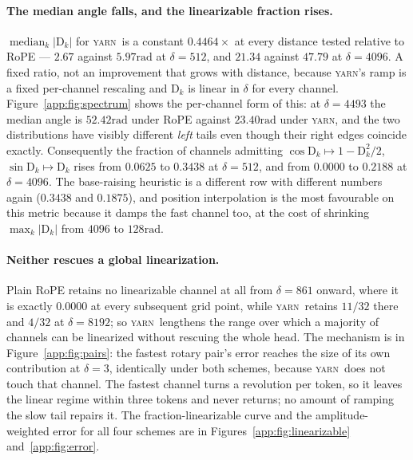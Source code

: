 \documentclass{article}
\theoremstyle{plain}
\theoremstyle{remark}
\newcommand{\yarn}{\textsc{yarn}}
\newcommand{\D}{\mathrm{D}_k}
\newcommand{\rad}{\mathrm{rad}}
\begin{document}
\paragraph{The median angle falls, and the linearizable fraction rises.}
$\operatorname{median}_k|\D|$ for \yarn\ is a constant $0.4464\times$ at every
distance tested relative to RoPE --- $2.67$ against $5.97\rad$ at $\delta = 512$,
and $21.34$ against $47.79$ at $\delta = 4096$. A fixed ratio, not an
improvement that grows with distance, because \yarn's ramp is a fixed
per-channel rescaling and $\D$ is linear in $\delta$ for every channel.
Figure~\ref{app:fig:spectrum} shows the per-channel form of this: at
$\delta = 4493$ the median angle is $52.42\rad$ under RoPE against
$23.40\rad$ under \yarn, and the two distributions have visibly different
\emph{left} tails even though their right edges coincide exactly.
Consequently the fraction of channels admitting $\cos \D \mapsto 1 - \D^2/2$,
$\sin \D \mapsto \D$ rises from $0.0625$ to $0.3438$ at $\delta = 512$, and from
$0.0000$ to $0.2188$ at $\delta = 4096$. The base-raising heuristic is a
different row with different numbers again ($0.3438$ and $0.1875$), and
position interpolation is the most favourable on this metric because it damps
the fast channel too, at the cost of shrinking $\max_k|\D|$ from $4096$ to
$128\rad$.

\paragraph{Neither rescues a global linearization.}
Plain RoPE retains no linearizable channel at all from $\delta = 861$ onward,
where it is exactly $0.0000$ at every subsequent grid point, while \yarn\ retains
$11/32$ there and $4/32$ at $\delta = 8192$; so \yarn\ lengthens the range over
which a majority of channels can be linearized without rescuing the whole head.
The mechanism is in Figure~\ref{app:fig:pairs}: the fastest rotary pair's error
reaches the size of its own contribution at $\delta = 3$, identically under both
schemes, because \yarn\ does not touch that channel. The fastest channel turns a
revolution per token, so it leaves the linear regime within three tokens and
never returns; no amount of ramping the slow tail repairs it. The
fraction-linearizable curve and the amplitude-weighted error for all four
schemes are in Figures~\ref{app:fig:linearizable} and~\ref{app:fig:error}.
\end{document}
